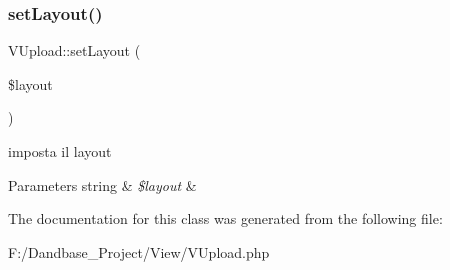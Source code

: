 \subsubsection{\texorpdfstring{set\+Layout()}{setLayout()}}
{\footnotesize\ttfamily V\+Upload\+::set\+Layout (\begin{DoxyParamCaption}\item[{}]{\$layout }\end{DoxyParamCaption})}

imposta il layout


\begin{DoxyParams}[1]{Parameters}
string & {\em \$layout} & \\
\hline
\end{DoxyParams}


The documentation for this class was generated from the following file\+:\begin{DoxyCompactItemize}
\item 
F\+:/\+Dandbase\+\_\+\+Project/\+View/V\+Upload.\+php\end{DoxyCompactItemize}
